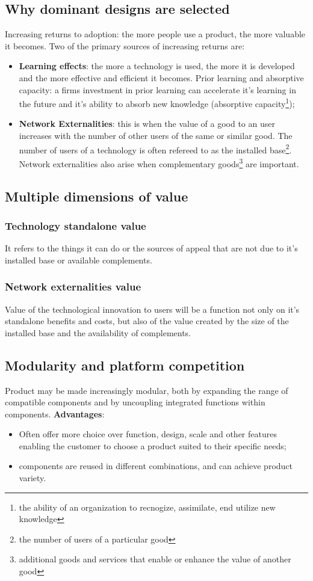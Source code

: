\documentclass[12pt]{article}
\begin{document}
\subsection{Why dominant designs are selected}
Increasing returns to adoption: the more people use a product, the more valuable it becomes.
Two of the primary sources of increasing returns are:
\begin{itemize}
    \item \textbf{Learning effects}: the more a technology is used, the more it is developed and the more effective and efficient it becomes.
    Prior learning and absorptive capacity: a firms investment in prior learning can accelerate it's learning in the future and it's ability to absorb new knowledge (absorptive capacity\footnote{the ability of an organization to recnogize, assimilate, end utilize new knowledge});
    \item \textbf{Network Externalities}: this is when the value of a good to an user increases with the number of other users of the same or similar good.
    The number of users of a technology is often refereed to as the installed base\footnote{the number of users of a particular good}.
    Network externalities also arise when complementary goods\footnote{additional goods and services that enable or enhance the value of another good} are important.
\end{itemize}
\subsection{Multiple dimensions of value}
\subsubsection{Technology standalone value}
It refers to the things it can do or the sources of appeal that are not due to it's installed base or available complements.
\subsubsection{Network externalities value}
Value of the technological innovation to users will be a function not only on it's standalone benefits and costs, but also of the value created by the size
of the installed base and the availability of complements.
\subsection{Modularity and platform competition}
Product may be made increasingly modular, both by expanding the range of compatible components and by uncoupling integrated functions within components.
\textbf{Advantages}:
\begin{itemize}
    \item Often offer more choice over function, design, scale and other features enabling the customer to choose a product suited to their specific needs;
    \item components are reused in different combinations, and can achieve product variety.
\end{itemize}
\end{document}
